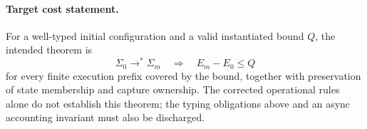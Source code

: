 \documentclass[11pt]{article}
\begin{document}
\paragraph{Target cost statement.}
For a well-typed initial configuration and a valid instantiated bound $Q$,
the intended theorem is
\[
 \Sigma_0\longrightarrow^*\Sigma_m
 \quad\Longrightarrow\quad E_m-E_0\leq Q
\]
for every finite execution prefix covered by the bound, together with
preservation of state membership and capture ownership. The corrected
operational rules alone do not establish this theorem; the typing obligations
above and an async accounting invariant must also be discharged.
\end{document}
